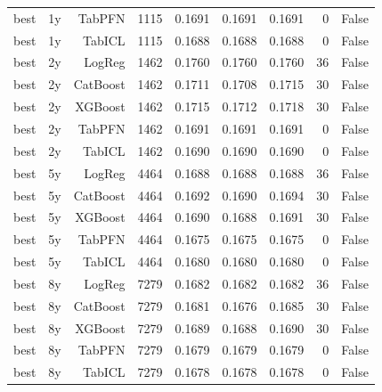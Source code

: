 \begin{table}[t]
\begin{tabular}{lrrrrrrrr}
  best & 1y & TabPFN & 1115 & 0.1691 & 0.1691 & 0.1691 & 0 & False \\
  best & 1y & TabICL & 1115 & 0.1688 & 0.1688 & 0.1688 & 0 & False \\
  best & 2y & LogReg & 1462 & 0.1760 & 0.1760 & 0.1760 & 36 & False \\
  best & 2y & CatBoost & 1462 & 0.1711 & 0.1708 & 0.1715 & 30 & False \\
  best & 2y & XGBoost & 1462 & 0.1715 & 0.1712 & 0.1718 & 30 & False \\
  best & 2y & TabPFN & 1462 & 0.1691 & 0.1691 & 0.1691 & 0 & False \\
  best & 2y & TabICL & 1462 & 0.1690 & 0.1690 & 0.1690 & 0 & False \\
  best & 5y & LogReg & 4464 & 0.1688 & 0.1688 & 0.1688 & 36 & False \\
  best & 5y & CatBoost & 4464 & 0.1692 & 0.1690 & 0.1694 & 30 & False \\
  best & 5y & XGBoost & 4464 & 0.1690 & 0.1688 & 0.1691 & 30 & False \\
  best & 5y & TabPFN & 4464 & 0.1675 & 0.1675 & 0.1675 & 0 & False \\
  best & 5y & TabICL & 4464 & 0.1680 & 0.1680 & 0.1680 & 0 & False \\
  best & 8y & LogReg & 7279 & 0.1682 & 0.1682 & 0.1682 & 36 & False \\
  best & 8y & CatBoost & 7279 & 0.1681 & 0.1676 & 0.1685 & 30 & False \\
  best & 8y & XGBoost & 7279 & 0.1689 & 0.1688 & 0.1690 & 30 & False \\
  best & 8y & TabPFN & 7279 & 0.1679 & 0.1679 & 0.1679 & 0 & False \\
  best & 8y & TabICL & 7279 & 0.1678 & 0.1678 & 0.1678 & 0 & False \\
  \bottomrule
  \end{tabular}
\end{table}
